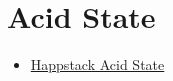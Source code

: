 \chapter{Acid State}

\begin{itemize}
    \item \href{http://happstack.com/docs/crashcourse/AcidState.html}{Happstack Acid State}
\end{itemize}
